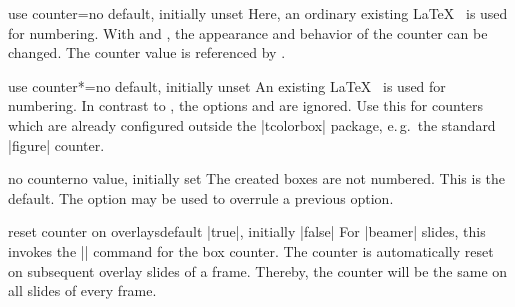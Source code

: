\clearpage
\begin{newTcbKey}{use counter}{=}{no default, initially unset}
Here, an ordinary existing \LaTeX\  is used for numbering.
With  and
, the appearance and behavior of the counter
can be changed. The counter value is referenced by .

\end{newTcbKey}


\begin{newTcbKey}[][doc new=2014-09-19]{use counter*}{=}{no default, initially unset}
An existing \LaTeX\  is used for numbering. In contrast to
, the options  and
 are ignored. Use this for counters which
are already configured outside the |tcolorbox| package, e.\,g.\ the standard
|figure| counter.
\end{newTcbKey}


\begin{newTcbKey}{no counter}{}{no value, initially set}
The created boxes are not numbered. This is the default. The option may
be used to overrule a previous option.
\end{newTcbKey}


\begin{newTcbKey}[][doc new=2019-10-18]{reset counter on overlays}{}{default |true|, initially |false|}
For |beamer| slides, this invokes the |\resetcounteronoverlays| command
for the box counter. The counter is automatically reset on subsequent
overlay slides of a frame.
Thereby, the counter will be the same on all slides of every frame.
\end{newTcbKey}


